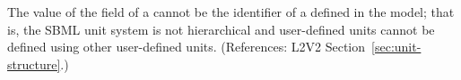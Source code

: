 The value of the  field of a \UnitDefinition cannot be the
identifier of a \Unit defined in the model; that is, the SBML unit system
is not hierarchical and user-defined units cannot be defined using other
user-defined units.  (References: L2V2 Section~\ref{sec:unit-structure}.)
